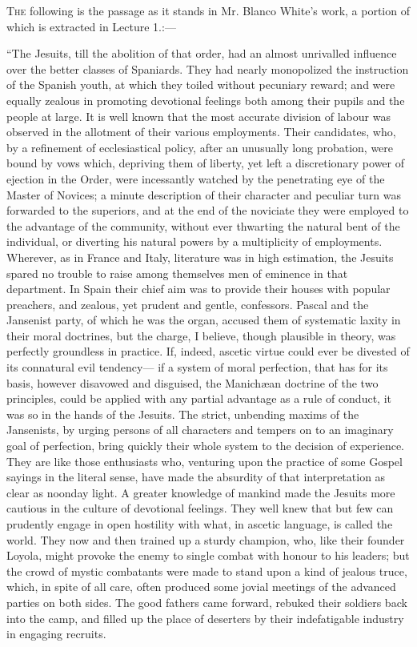 




T\textsc{he} following is the passage as it stands in Mr.
Blanco White's work, a portion of which is extracted in
Lecture 1.:—


``The Jesuits, till the abolition of that order,
had an almost unrivalled influence over the better
classes of Spaniards. They had nearly monopolized the
instruction of the Spanish youth, at which they toiled
without pecuniary reward; and were equally zealous in
promoting devotional feelings both among their pupils and
the people at large. It is well known that the most
accurate division of labour was observed in the allotment
of their various employments. Their candidates, who, by a
refinement of ecclesiastical policy, after an unusually
long probation, were bound by vows which, depriving them
of liberty, yet left a discretionary power of ejection in
the Order, were incessantly watched by the penetrating
eye of the Master of Novices; a minute description of
their character and peculiar turn was forwarded to the
superiors, and at the end of the noviciate they were
employed to the advantage of the community, without ever
thwarting the natural bent of the individual, or
diverting his natural powers by a multiplicity of
employments. Wherever, as in France and Italy, literature
was in high estimation, the Jesuits spared no trouble to
raise among themselves men of eminence in that
department. In Spain their chief aim was to provide their
houses with popular preachers, and zealous, yet prudent
and gentle, confessors. Pascal and the Jansenist party,
of which he was the organ, accused them of systematic
laxity in their moral doctrines, but the charge, I
believe, though plausible in theory, was perfectly
groundless in practice. If, indeed, ascetic virtue could
ever be divested of its connatural evil tendency— if
a system of moral perfection, that has for its basis,
however disavowed and disguised, the Manichæan doctrine
of the two principles, could be applied with any partial
advantage as a rule of conduct, it was so in the hands of
the Jesuits. The strict, unbending maxims of the
Jansenists, by urging persons of all characters and
tempers on to an imaginary goal of perfection, bring
quickly their whole system to the decision of experience.
They are like those enthusiasts who, venturing upon the
practice of some Gospel sayings in the literal sense,
have made the absurdity of that interpretation as clear
as noonday light. A greater knowledge of mankind made the
Jesuits more cautious in the culture of devotional
feelings. They well knew that but few can prudently
engage in open hostility with what, in ascetic language,
is called the world. They now and then trained up a
sturdy champion, who, like their founder Loyola, might
provoke the enemy to single combat with honour to his
leaders; but the crowd of mystic combatants were made to
stand upon a kind of jealous truce, which, in spite of
all care, often produced some jovial meetings of the
advanced parties on both sides. The good fathers came
forward, rebuked their soldiers back into the camp, and
filled up the place of deserters by their indefatigable
industry in engaging recruits.


